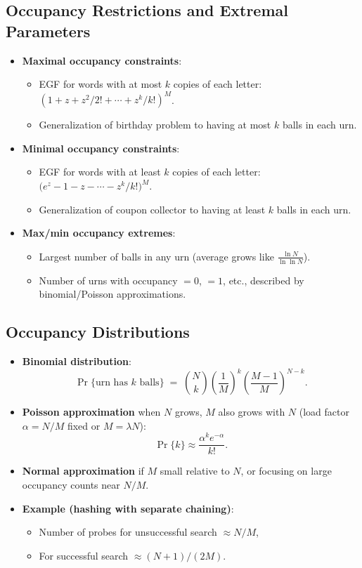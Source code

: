 \documentclass[11pt,letterpaper]{article}
\begin{document}
\subsection{Occupancy Restrictions and Extremal Parameters}
\begin{itemize}
  \item \textbf{Maximal occupancy constraints}:
    \begin{itemize}
      \item EGF for words with at most $k$ copies of each letter: $(1 + z + z^2/2! + \cdots + z^k/k!)^M$.
      \item Generalization of birthday problem to having at most $k$ balls in each urn.
    \end{itemize}
  \item \textbf{Minimal occupancy constraints}:
    \begin{itemize}
      \item EGF for words with at least $k$ copies of each letter: $\bigl(e^z - 1 - z - \cdots - z^k/k!\bigr)^M$.
      \item Generalization of coupon collector to having at least $k$ balls in each urn.
    \end{itemize}
  \item \textbf{Max/min occupancy extremes}:
    \begin{itemize}
      \item Largest number of balls in any urn (average grows like $\frac{\ln N}{\ln \ln N}$).
      \item Number of urns with occupancy $=0$, $=1$, etc., described by binomial/Poisson approximations.
    \end{itemize}
\end{itemize}

\subsection{Occupancy Distributions}
\begin{itemize}
  \item \textbf{Binomial distribution}:
    \[
      \Pr\{\text{urn has }k\text{ balls}\}
      \;=\;
      \binom{N}{k} \left(\frac{1}{M}\right)^k \left(\frac{M-1}{M}\right)^{N-k}.
    \]
  \item \textbf{Poisson approximation} when $N$ grows, $M$ also grows with $N$ (load factor $\alpha = N/M$ fixed or $M=\lambda N$):
    \[
      \Pr\{k\} \approx \frac{\alpha^k e^{-\alpha}}{k!}.
    \]
  \item \textbf{Normal approximation} if $M$ small relative to $N$, or focusing on large occupancy counts near $N/M$.
  \item \textbf{Example (hashing with separate chaining)}:
    \begin{itemize}
      \item Number of probes for unsuccessful search $\approx N/M$,
      \item For successful search $\approx (N+1)/(2M)$.
    \end{itemize}
\end{itemize}
\end{document}
